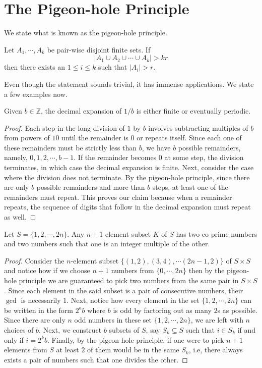 \section{The Pigeon-hole Principle}
We state what is known as the pigeon-hole principle.
\begin{theorem}
Let $A_{1},\cdots,A_{k}$ be pair-wise disjoint finite sets. If \[|A_{1}\cup A_{2}\cup \cdots \cup A_{k}|>kr\] then there exists an $1\leq i\leq k$ such that $|A_{i}|>r$.
\end{theorem}
Even though the statement sounds trivial, it has immense applications. We state a few examples now. 
\begin{claim}
Given $b\in \mathbb{Z}$, the decimal expansion of $1/b$ is either finite or eventually periodic.
\end{claim}
\begin{proof}
Each step in the long division of $1$ by $b$ involves subtracting multiples of $b$ from powers of $10$ until the remainder is $0$ or repeats itself. Since each one of these remainders must be strictly less than $b$, we have $b$ possible remainders, namely, $0, 1, 2, \cdots, b-1$. If the remainder becomes $0$ at some step, the division terminates, in which case the decimal expansion is finite. Next, consider the case where the division does not terminate. By the pigeon-hole principle, since there are only $b$ possible remainders and more than $b$ steps, at least one of the remainders must repeat. This proves our claim because when a remainder repeats, the sequence of digits that follow in the decimal expansion must repeat as well.
\end{proof}
\begin{claim}
Let $S=\{1,2,\cdots,2n\}$. Any $n+1$ element subset $K$ of $S$ has two co-prime numbers and two numbers such that one is an integer multiple of the other. 
\end{claim}
\begin{proof}
Consider the $n$-element subset $\{\left( 1,2 \right), \left( 3,4 \right), \cdots \left( 2n-1,2 \right)\}$ of $S\times S$ and notice how if we choose $n+1$ numbers from $\{0,\cdots,2n\}$ then by the pigeon-hole principle we are guaranteed to pick two numbers from the same pair in $S\times S$. Since each element in the said subset is a pair of consecutive numbers, their $\gcd$ is necessarily $1$. Next, notice how every element in the set $\{1,2,\cdots,2n\}$ can be written in the form $2^ab$ where $b$ is odd by factoring out as many $2$s as possible. Since there are only $n$ odd numbers in these set $\{1,2,\cdots,2n\}$, we are left with $n$ choices of $b$. Next, we construct $b$ subsets of $S$, say $S_k\subseteq S$ such that $i\in S_k$ if and only if $i=2^kb$. Finally, by the pigeon-hole principle, if one were to pick $n+1$ elements from $S$ at least $2$ of them would be in the same $S_k$, i.e, there always exists a pair of numbers such that one divides the other.
\end{proof}
